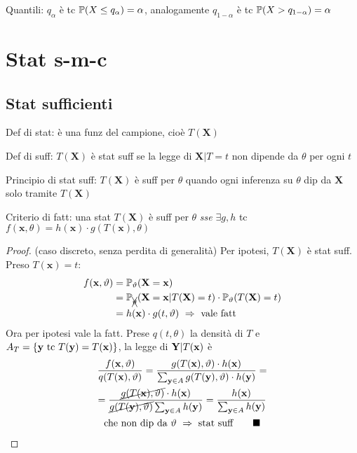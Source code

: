 
Quantili: $q_\alpha$ è tc $\mathbb{P}(X\leq q_\alpha)=\alpha$, analogamente $q_{1-\alpha}$ è tc $\mathbb{P}(X>q_{1-\alpha})=\alpha$

\smallskip


\section{Stat s-m-c}


\subsection{Stat sufficienti}

Def di stat: è una funz del campione, cioè $T(\mathbf{X})$ 

\smallskip

Def di suff: $T(\mathbf{X})$ è stat suff se la legge di $\mathbf{X}|T=t$ non dipende da $\theta$ per ogni $t$ 

\smallskip

Principio di stat suff: $T(\mathbf{X})$ è suff per $\theta$ quando ogni inferenza su $\theta$ dip da $\mathbf{X}$ solo tramite $T(\mathbf{X})$

\smallskip

Criterio di fatt: una stat  $T(\mathbf{X})$ è suff per $\theta$ \textit{sse} $\exists g, h$ tc $f(\mathbf{x},\theta)=h(\mathbf{x})\cdot g(T(\mathbf{x}),\theta)$

\begin{proof}
(caso discreto, senza perdita di generalità) Per ipotesi, $T(\mathbf{X})$ è stat suff. Preso $T(\mathbf{x})=t$:
\begin{align*}
f(\mathbf{x},\vartheta)&=\mathbb{P}_\vartheta(\mathbf{X}=\mathbf{x}) \\
&=\mathbb{P}_{\xcancel{\vartheta}}(\mathbf{X}=\mathbf{x}|T(\mathbf{X})=t)\cdot \mathbb{P}_\vartheta(T(\mathbf{X})=t) \\
&=h(\mathbf{x})\cdot g(t,\vartheta)\ \Rightarrow\ \text{vale fatt}
\end{align*}
Ora per ipotesi vale la fatt. Prese $q(t,\theta)$ la densità di $T$ e $A_T=\{\mathbf{y}\text{ tc }T(\mathbf{y})=T(\mathbf{x})\}$, la legge di $\mathbf{Y}|T(\mathbf{x})$ è
\begin{gather*}
\frac{f(\mathbf{x},\vartheta)}{q(T(\mathbf{x}),\vartheta)}=\frac{g(T(\mathbf{x}),\vartheta) \cdot h(\mathbf{x})}{\sum_{\mathbf{y}\in A} g(T(\mathbf{y}),\vartheta) \cdot h(\mathbf{y})}= \\
=\frac{\cancel{g(T(\mathbf{x}),\vartheta)} \cdot h(\mathbf{x})}{\cancel{g(T(\mathbf{y}),\vartheta)} \sum_{\mathbf{y}\in A} h(\mathbf{y})}=\frac{h(\mathbf{x})}{\sum_{\mathbf{y}\in A} h(\mathbf{y})}\\
\text{che non dip da }\vartheta\ \Rightarrow\ \text{stat suff}\qquad \blacksquare
\end{gather*}
\end{proof}

